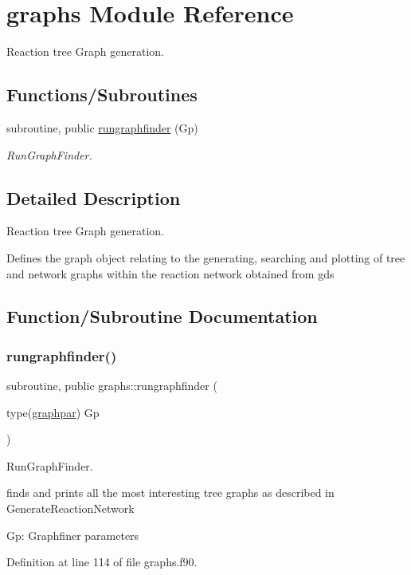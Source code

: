 \hypertarget{namespacegraphs}{}\section{graphs Module Reference}
\label{namespacegraphs}


Reaction tree Graph generation.  


\subsection*{Functions/\+Subroutines}
\begin{DoxyCompactItemize}
\item 
subroutine, public \mbox{\hyperlink{namespacegraphs_a039ad85f72a6020aeb9b35ffdbc1bcd9}{rungraphfinder}} (Gp)
\begin{DoxyCompactList}\small\item\em Run\+Graph\+Finder. \end{DoxyCompactList}\end{DoxyCompactItemize}


\subsection{Detailed Description}
Reaction tree Graph generation. 

Defines the graph object relating to the generating, searching and plotting of tree and network graphs within the reaction network obtained from gds 

\subsection{Function/\+Subroutine Documentation}
\mbox{\label{namespacegraphs_a039ad85f72a6020aeb9b35ffdbc1bcd9}} 
\subsubsection{\texorpdfstring{rungraphfinder()}{rungraphfinder()}}
{\footnotesize\ttfamily subroutine, public graphs\+::rungraphfinder (\begin{DoxyParamCaption}\item[{type(\mbox{\hyperlink{structglobaldata_1_1graphpar}{graphpar}})}]{Gp }\end{DoxyParamCaption})}



Run\+Graph\+Finder. 

finds and prints all the most interesting tree graphs as described in Generate\+Reaction\+Network


\begin{DoxyItemize}
\item Gp\+: Graphfiner parameters 
\end{DoxyItemize}

Definition at line 114 of file graphs.\+f90.

